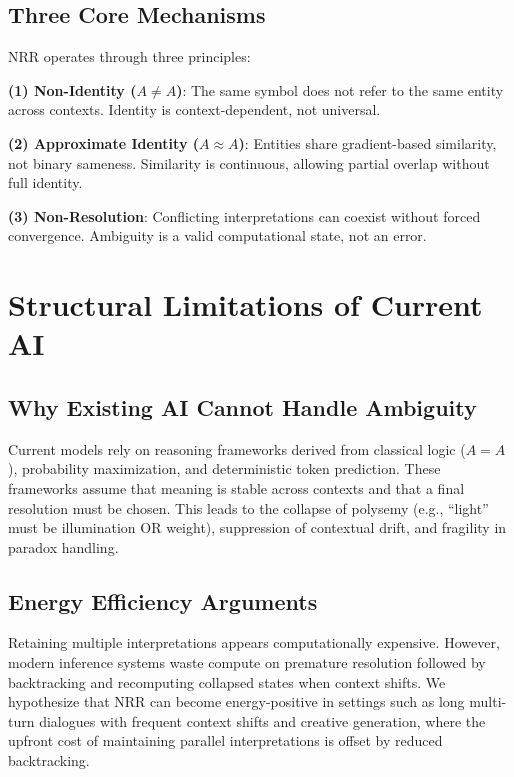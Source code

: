 \documentclass[11pt,a4paper]{article}
\begin{document}
\subsection{Three Core Mechanisms}

NRR operates through three principles:

\textbf{(1) Non-Identity ($A \neq A$)}: The same symbol does not refer to the same entity across contexts.
Identity is context-dependent, not universal.

\textbf{(2) Approximate Identity ($A \approx A$)}: Entities share gradient-based similarity, not binary sameness.
Similarity is continuous, allowing partial overlap without full identity.

\textbf{(3) Non-Resolution}: Conflicting interpretations can coexist without forced convergence.
Ambiguity is a valid computational state, not an error.

\section{Structural Limitations of Current AI}

\subsection{Why Existing AI Cannot Handle Ambiguity}

Current models rely on reasoning frameworks derived from classical logic ($A = A$), probability maximization, and deterministic token prediction.
These frameworks assume that meaning is stable across contexts and that a final resolution must be chosen.
This leads to the collapse of polysemy (e.g., ``light'' must be illumination OR weight), suppression of contextual drift, and fragility in paradox handling.

\subsection{Energy Efficiency Arguments}

Retaining multiple interpretations appears computationally expensive.
However, modern inference systems waste compute on premature resolution followed by backtracking and recomputing collapsed states when context shifts.
We hypothesize that NRR can become energy-positive in settings such as long multi-turn dialogues with frequent context shifts and creative generation, where the upfront cost of maintaining parallel interpretations is offset by reduced backtracking.
\end{document}

